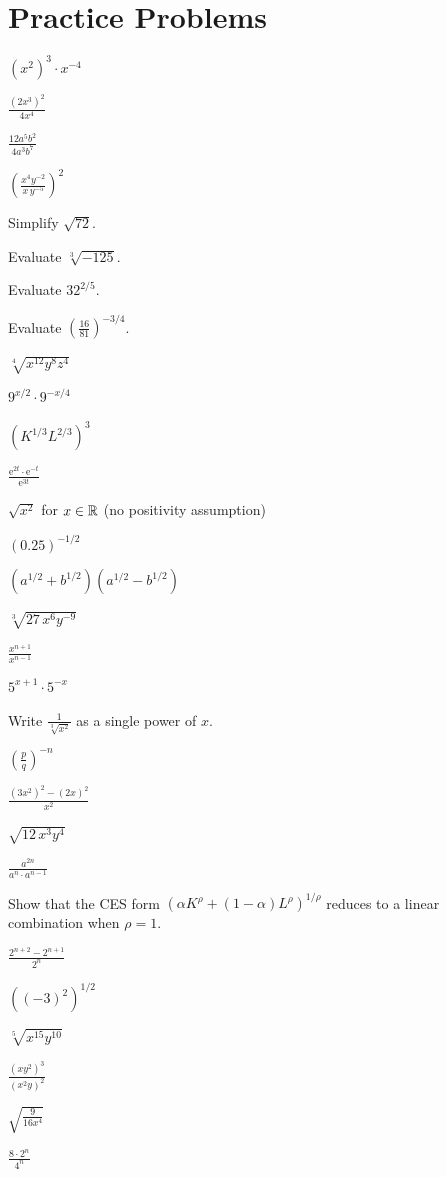 \section{Practice Problems}

\begin{problems}
  \item $(x^{2})^{3}\cdot x^{-4}$
  \item $\displaystyle\frac{(2x^{3})^{2}}{4x^{4}}$
  \item $\displaystyle\frac{12a^{5}b^{2}}{4a^{3}b^{7}}$
  \item $\displaystyle\left(\frac{x^{4}y^{-2}}{x\,y^{-5}}\right)^{2}$
  \item Simplify $\sqrt{72}$.
  \item Evaluate $\sqrt[3]{-125}$.
  \item Evaluate $32^{2/5}$.
  \item Evaluate $\displaystyle\left(\frac{16}{81}\right)^{-3/4}$.
  \item $\sqrt[4]{x^{12}y^{8}z^{4}}$
  \item $9^{x/2}\cdot 9^{-x/4}$
  \item $(K^{1/3}L^{2/3})^{3}$
  \item $\displaystyle\frac{\mathrm{e}^{2t}\cdot \mathrm{e}^{-t}}{\mathrm{e}^{3t}}$
  \item $\sqrt{x^{2}}$ for $x\in\mathbb{R}$ (no positivity assumption)
  \item $(0.25)^{-1/2}$
  \item $(a^{1/2}+b^{1/2})(a^{1/2}-b^{1/2})$
  \item $\sqrt[3]{27\,x^{6}y^{-9}}$
  \item $\displaystyle\frac{x^{n+1}}{x^{n-1}}$
  \item $5^{x+1}\cdot 5^{-x}$
  \item Write $\displaystyle\frac{1}{\sqrt[3]{x^{2}}}$ as a single power of $x$.
  \item $\displaystyle\left(\frac{p}{q}\right)^{-n}$
  \item $\displaystyle\frac{(3x^{2})^{2}-(2x)^{2}}{x^{2}}$
  \item $\sqrt{12\,x^{3}y^{4}}$
  \item $\displaystyle\frac{a^{2n}}{a^{n}\cdot a^{n-1}}$
  \item Show that the CES form $(\alpha K^{\rho}+(1-\alpha)L^{\rho})^{1/\rho}$
        reduces to a linear combination when $\rho=1$.
  \item $\displaystyle\frac{2^{n+2}-2^{n+1}}{2^{n}}$
  \item $\left((-3)^{2}\right)^{1/2}$
  \item $\sqrt[5]{x^{15}y^{10}}$
  \item $\displaystyle\frac{(xy^{2})^{3}}{(x^{2}y)^{2}}$
  \item $\displaystyle\sqrt{\frac{9}{16x^{4}}}$
  \item $\displaystyle\frac{8\cdot 2^{n}}{4^{n}}$
\end{problems}

